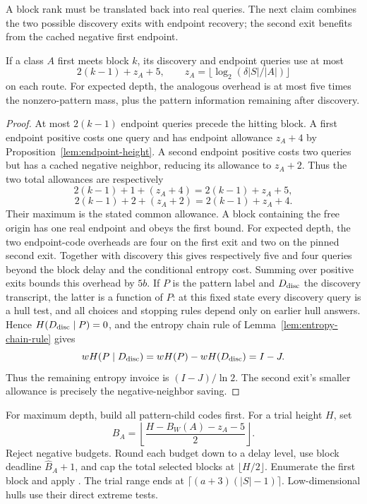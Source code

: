 A block rank must be translated back into real queries. The next claim
combines the two possible discovery exits with endpoint recovery;
the second exit benefits from the cached negative first endpoint.

\begin{claim}
\label{clm:qp-block-allowance}
If a class $A$ first meets block $k$, its discovery and endpoint
queries use at most
\begin{equation}\label{eq:qp-block-allowance}
 2(k-1)+z_A+5,\qquad
 z_A=\lfloor\log_2(\delta|S|/|A|)\rfloor
\end{equation}
on each route. For expected depth, the analogous overhead is at most
five times the nonzero-pattern mass, plus the pattern information
remaining after discovery.
\end{claim}
\begin{proof}
At most $2(k-1)$ endpoint queries precede the hitting block. A first
endpoint positive costs one query and has endpoint allowance
$z_A+4$ by Proposition~\ref{lem:endpoint-height}. A second endpoint positive costs two queries but has a
cached negative neighbor, reducing its allowance to $z_A+2$.
Thus the two total allowances are respectively
\[
 2(k-1)+1+(z_A+4)=2(k-1)+z_A+5,
\]
\[
 2(k-1)+2+(z_A+2)=2(k-1)+z_A+4.
\]
Their maximum is the stated common allowance.
A block containing the free origin has one real endpoint and obeys
the first bound. For expected depth, the two endpoint-code overheads
are four on the first exit and two on the pinned second exit.
Together with discovery this gives respectively five and four queries
beyond the block delay and the conditional entropy cost. Summing over
positive exits bounds this overhead by $5b$. If $P$ is the pattern
label and $D_{\rm disc}$ the discovery transcript, the latter is a
function of $P$: at this fixed state every discovery query is a hull
test, and all choices and stopping rules depend only on earlier hull
answers. Hence $H(D_{\rm disc}\mid P)=0$, and the entropy chain rule
of Lemma~\ref{lem:entropy-chain-rule} gives
\[
 wH(P\mid D_{\rm disc})=wH(P)-wH(D_{\rm disc})=I-J.
\]
Thus the remaining entropy invoice is $(I-J)/\ln2$. The second
exit's smaller allowance is precisely the negative-neighbor saving.
\end{proof}

For maximum depth, build all pattern-child codes first. For a trial
height $H$, set
\[
 B_A=\left\lfloor\frac{H-B_W(A)-z_A-5}{2}\right\rfloor.
\]
Reject negative budgets. Round each budget down to a delay level,
use block deadline $\widehat B_A+1$, and cap the total selected
blocks at $\lfloor H/2\rfloor$. Enumerate the first block and apply
\GradeDP. The trial range ends at
$\lceil(a+3)(|S|-1)\rceil$. Low-dimensional hulls use their direct
extreme tests.

